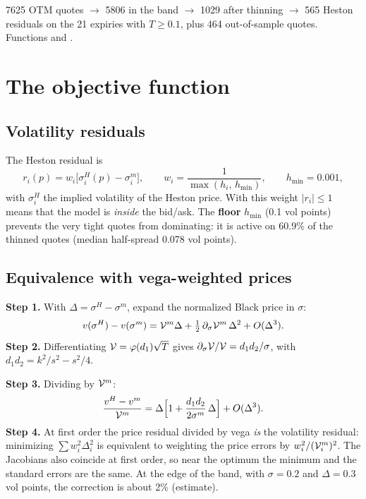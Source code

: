 \begin{progetto}[title={In the qpricer project: the targets}]
7625 OTM quotes $\to$ 5806 in the band $\to$ 1029 after thinning $\to$ 565 Heston residuals on the 21 expiries with
$T\ge0.1$, plus 464 out-of-sample quotes. Functions  and .
\end{progetto}

\section{The objective function}
\subsection{Volatility residuals}
The Heston residual is
\begin{equation}\label{eq:cal-res}
r_i(p)=w_i\big[\sigma^H_i(p)-\sigma^m_i\big],\qquad w_i=\frac{1}{\max(h_i,\,h_{\min})},\qquad h_{\min}=0.001 ,
\end{equation}
with $\sigma^H_i$ the implied volatility of the Heston price. With this weight $|r_i|\le1$ means that the model is
\emph{inside} the bid/ask. The \textbf{floor} $h_{\min}$ (0.1 vol points) prevents the very tight quotes from
dominating: it is active on 60.9\% of the thinned quotes (median half-spread 0.078 vol points).

\subsection{Equivalence with vega-weighted prices}
\noindent\textbf{Step 1.} With $\Delta=\sigma^H-\sigma^m$, expand the normalized Black price in $\sigma$:
\[
v(\sigma^H)-v(\sigma^m)=\mathcal{V}^m\Delta+\tfrac12\,\partial_\sigma\mathcal{V}^m\,\Delta^2+O(\Delta^3).
\]
\noindent\textbf{Step 2.} Differentiating $\mathcal{V}=\varphi(d_1)\sqrt T$ gives $\partial_\sigma\mathcal{V}/\mathcal{V}=d_1d_2/\sigma$,
with $d_1d_2=k^2/s^2-s^2/4$.

\noindent\textbf{Step 3.} Dividing by $\mathcal{V}^m$:
\begin{equation}\label{eq:cal-prezzo-vol}
\frac{v^H-v^m}{\mathcal{V}^m}=\Delta\Big[1+\frac{d_1d_2}{2\sigma^m}\,\Delta\Big]+O(\Delta^3).
\end{equation}
\noindent\textbf{Step 4.} At first order the price residual divided by vega \emph{is} the volatility residual:
minimizing $\sum w_i^2\Delta_i^2$ is equivalent to weighting the price errors by $w_i^2/(\mathcal{V}^m_i)^2$. The Jacobians
also coincide at first order, so near the optimum the minimum and the standard errors are the same. At the edge of
the band, with $\sigma=0.2$ and $\Delta=0.3$ vol points, the correction is about 2\% (estimate).

